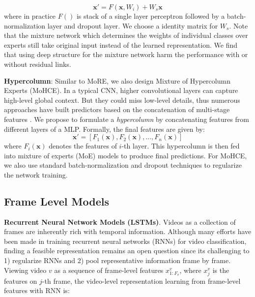 \documentclass[10pt,twocolumn,letterpaper]{article}
\begin{document}
\begin{equation}
    \mathbf{x}'=F(\mathbf{x},{W_i})+W_s\mathbf{x}
\end{equation}
where in practice $F()$ is stack of a single layer perceptron followed by a batch-normalization layer and dropout layer. We choose a identity matrix for $W_s$. Note that the mixture network which determines the weights of individual classes over experts still take original input instead of the learned representation. We find that using deep structure for the mixture network harm the performance with or without residual links.

\textbf{Hypercolumn}:
Similar to MoRE, we also design Mixture of Hypercolumn Experts (MoHCE). In a typical CNN, higher convolutional layers can capture high-level global context. But they could miss low-level details, thus numerous approaches have built predictors based on the concatenation of multi-stage features \cite{bansal2017pixelnet} \cite{lin2016feature}. We propose to formulate a \textit{hypercolumn} by concatenating features from different layers of a MLP. Formally, the final features are given by:
\begin{equation}
    \mathbf{x'} = [F_1(\mathbf{x}), F_2(\mathbf{x}), ..., F_n(\mathbf{x})]
\end{equation}
where $F_i(\mathbf{x})$ denotes the features of $i$-th layer. This hypercolumn is then fed into mixture of experts (MoE) models to produce final predictions. For MoHCE, we also use standard batch-normalization and dropout techniques to regularize the network training. 


\subsection{Frame Level Models}
\textbf{Recurrent Neural Network Models (LSTMs)}. Videos as a collection of frames are inherently rich with temporal information. 
Although many efforts have been made in training recurrent neural networks (RNNs) for video classification, finding a feasible representation remains an open question since its challenging to 1) regularize RNNs and 2) pool representative information frame by frame. Viewing video $v$ as a sequence of frame-level features $x_{1:F_v}^v$, where $x_j^v$ is the features on $j$-th frame, the video-level representation learning from frame-level features with RNN is:
\end{document}
